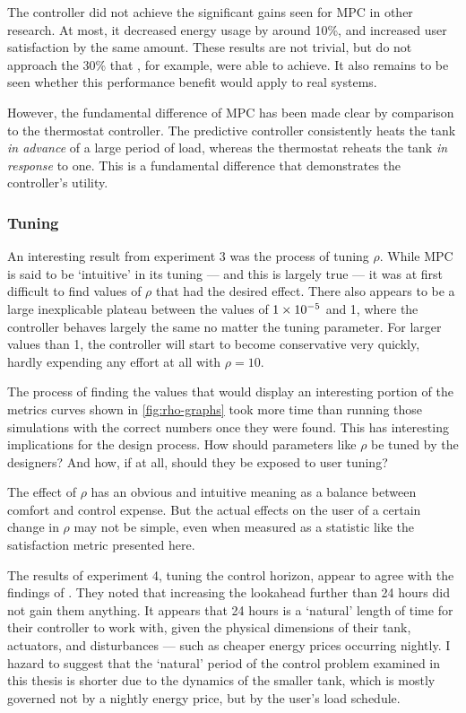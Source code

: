 The controller did not achieve the significant gains seen for MPC in other research.
At most, it decreased energy usage by around 10\%, and increased user satisfaction by the same amount.
These results are not trivial, but do not approach the 30\% that , for example, were able to achieve.
It also remains to be seen whether this performance benefit would apply to real systems.

However, the fundamental difference of MPC has been made clear by comparison to the thermostat controller.
The predictive controller consistently heats the tank \emph{in advance} of a large period of load, whereas the thermostat reheats the tank \emph{in response} to one.
This is a fundamental difference that demonstrates the controller's utility.

\subsubsection{Tuning}

An interesting result from experiment 3 was the process of tuning $\rho$.
While MPC is said to be `intuitive' in its tuning --- and this is largely true --- it was at first difficult to find values of $\rho$ that had the desired effect.
There also appears to be a large inexplicable plateau between the values of $1\times 10^{-5}$ and 1, where the controller behaves largely the same no matter the tuning parameter.
For larger values than 1, the controller will start to become conservative very quickly, hardly expending any effort at all with $\rho=10$.

The process of finding the values that would display an interesting portion of the metrics curves shown in \autoref{fig:rho-graphs} took more time than running those simulations with the correct numbers once they were found.
This has interesting implications for the design process.
How should parameters like $\rho$ be tuned by the designers?
And how, if at all, should they be exposed to user tuning?

The effect of $\rho$ has an obvious and intuitive meaning as a balance between comfort and control expense.
But the actual effects on the user of a certain change in $\rho$ may not be simple, even when measured as a statistic like the satisfaction metric presented here.

The results of experiment 4, tuning the control horizon, appear to agree with the findings of \textcite{Halvgaard12}.
They noted that increasing the lookahead further than 24 hours did not gain them anything.
It appears that 24 hours is a `natural' length of time for their controller to work with, given the physical dimensions of their tank, actuators, and disturbances --- such as cheaper energy prices occurring nightly.
I hazard to suggest that the `natural' period of the control problem examined in this thesis is shorter due to the dynamics of the smaller tank, which is mostly governed not by a nightly energy price, but by the user's load schedule.

